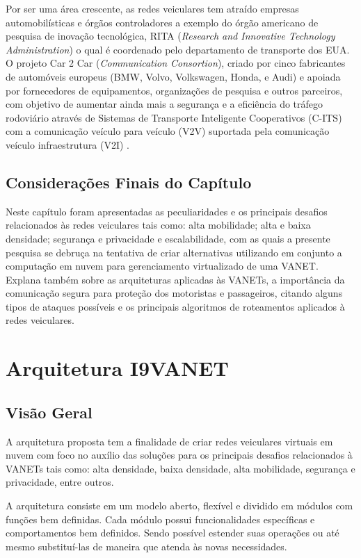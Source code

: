 \documentclass[
	12pt,				%
	oneside,			%
	a4paper,			%
	english,			%
	brazil				%
	]{abntex2ppgsi}
\begin{document}
Por ser uma área crescente, as redes veiculares tem atraído empresas automobilísticas e órgãos controladores  a exemplo do órgão americano de pesquisa de inovação tecnológica, RITA (\textit{Research and Innovative Technology Administration}) o qual é coordenado pelo departamento de transporte dos EUA. O projeto Car 2 Car (\textit{Communication Consortion}), criado por cinco fabricantes de automóveis europeus (BMW, Volvo, Volkswagen, Honda, e Audi) e apoiada por fornecedores de equipamentos, organizações de pesquisa e outros parceiros, com objetivo de aumentar ainda mais a segurança e a eficiência do tráfego rodoviário através de Sistemas de Transporte Inteligente Cooperativos (C-ITS) com a comunicação veículo para veículo (V2V) suportada pela comunicação veículo infraestrutura (V2I) . 

\section{Considerações Finais do Capítulo}
Neste capítulo foram apresentadas as peculiaridades e os principais desafios relacionados às redes veiculares tais como: alta mobilidade; alta e baixa densidade; segurança e privacidade e escalabilidade, com as quais a presente pesquisa se debruça na tentativa de criar alternativas utilizando em conjunto a computação em nuvem para gerenciamento virtualizado de uma VANET. Explana também sobre as arquiteturas aplicadas às VANETs, a importância da comunicação segura para proteção dos motoristas e passageiros, citando alguns tipos de ataques possíveis e os principais algoritmos de roteamentos aplicados à redes veiculares.

\chapter{Arquitetura I9VANET}\label{sec:i9vanet}

\section{Visão Geral}
A arquitetura proposta tem a finalidade de criar redes veiculares virtuais em nuvem com foco no auxílio das soluções para os principais desafios relacionados à VANETs tais como: alta densidade, baixa densidade, alta mobilidade, segurança e privacidade, entre outros. 

A arquitetura consiste em um modelo aberto, flexível e dividido em módulos com funções bem definidas. Cada módulo possui funcionalidades específicas e comportamentos bem definidos. Sendo possível estender suas operações ou até mesmo substituí-las de maneira que atenda às novas necessidades.
\end{document}
